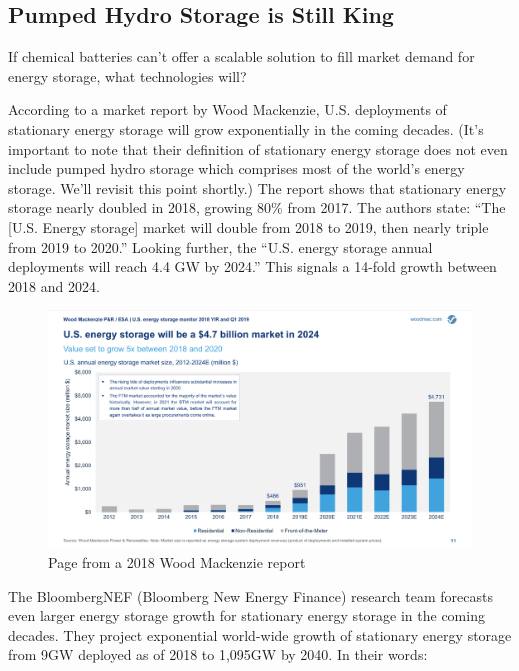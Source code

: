 \documentclass[hidelinks,12pt,a4paper]{article}
\begin{document}
\subsection{Pumped Hydro Storage is Still King}
If chemical batteries can't offer a scalable solution to fill market demand for energy storage, what technologies will?

According to a market report by Wood Mackenzie, U.S. deployments of stationary energy storage will grow exponentially in the coming decades. (It's important to note that their definition of stationary energy storage does not even include pumped hydro storage which comprises most of the world's energy storage. We'll revisit this point shortly.) The report shows that stationary energy storage nearly doubled in 2018, growing 80\% from 2017. \cite{USEnergyStorageMonitor2018YIRAndQ12019} The authors state: “The [U.S. Energy storage] market will double from 2018 to 2019, then nearly triple from 2019 to 2020.” Looking further, the “U.S. energy storage annual deployments will reach 4.4 GW by 2024.” This signals a 14-fold growth between 2018 and 2024.

\begin{figure}[ht!]
    \centering
    \includegraphics[width=1\textwidth]{US-ESM-2018-YIR-Executive-Summary-us-energy-storage-market-in-2024.png}
    \caption{Page from a 2018 Wood Mackenzie report \cite{USEnergyStorageMonitor2018YIRAndQ12019}}
\end{figure}
\FloatBarrier

The BloombergNEF (Bloomberg New Energy Finance) research team forecasts even larger energy storage growth for stationary energy storage in the coming decades. They project exponential world-wide growth of stationary energy storage from 9GW deployed as of 2018 to 1,095GW by 2040. In their words:
\end{document}
